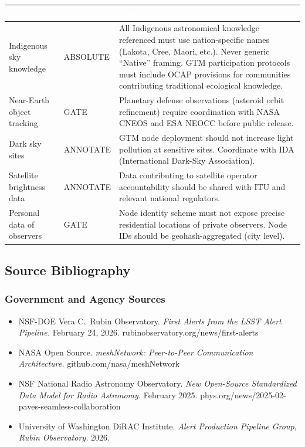 \documentclass[11pt,letterpaper]{article}
\newcommand{\tableheader}[1]{\textbf{\sffamily\textcolor{white}{#1}}}
\begin{document}
\begin{center}
\begin{tabularx}{\textwidth}{L{3.5cm}L{2cm}X}
\toprule
{}
\tableheader{Area} & \tableheader{Type} & \tableheader{Guidance} \\
\midrule
Indigenous sky knowledge & ABSOLUTE & All Indigenous astronomical knowledge referenced must use nation-specific names (Lakota, Cree, Maori, etc.). Never generic ``Native'' framing. GTM participation protocols must include OCAP provisions for communities contributing traditional ecological knowledge. \\
Near-Earth object tracking & GATE & Planetary defense observations (asteroid orbit refinement) require coordination with NASA CNEOS and ESA NEOCC before public release. \\
Dark sky sites & ANNOTATE & GTM node deployment should not increase light pollution at sensitive sites. Coordinate with IDA (International Dark-Sky Association). \\
Satellite brightness data & ANNOTATE & Data contributing to satellite operator accountability should be shared with ITU and relevant national regulators. \\
Personal data of observers & GATE & Node identity scheme must not expose precise residential locations of private observers. Node IDs should be geohash-aggregated (city level). \\
\bottomrule
\end{tabularx}
\end{center}

\subsection{Source Bibliography}

\subsubsection{Government and Agency Sources}

\begin{itemize}
  \item NSF-DOE Vera C.\ Rubin Observatory. \textit{First Alerts from the LSST Alert Pipeline.} February 24, 2026. rubinobservatory.org/news/first-alerts
  \item NASA Open Source. \textit{meshNetwork: Peer-to-Peer Communication Architecture.} github.com/nasa/meshNetwork
  \item NSF National Radio Astronomy Observatory. \textit{New Open-Source Standardized Data Model for Radio Astronomy.} February 2025. phys.org/news/2025-02-paves-seamless-collaboration
  \item University of Washington DiRAC Institute. \textit{Alert Production Pipeline Group, Rubin Observatory.} 2026.
\end{itemize}
\end{document}
